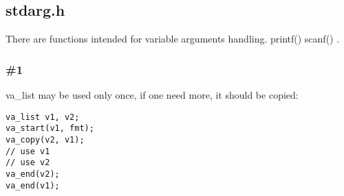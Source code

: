 \subsection{stdarg.h}

{There are functions intended for variable arguments handling}.
 printf() \AndENRU scanf() 
.

\subsubsection{ \#1}

 va\_list 
{may be used only once, if one need more, it should be copied}:

\begin{lstlisting}
va_list v1, v2;
va_start(v1, fmt);
va_copy(v2, v1);
// use v1
// use v2
va_end(v2);
va_end(v1);
\end{lstlisting}

